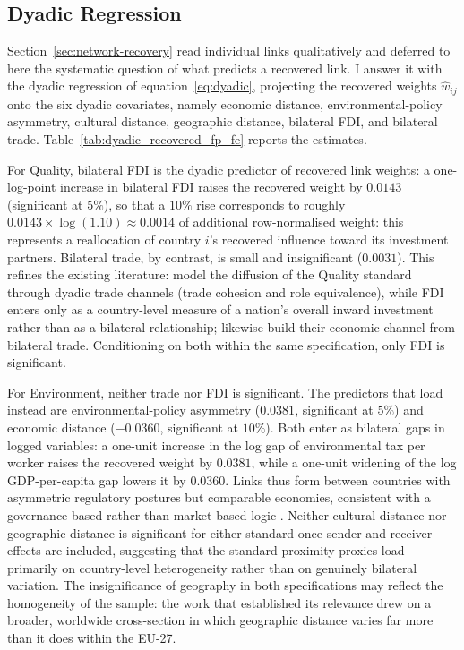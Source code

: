 \documentclass[12pt,a4paper]{article}
\begin{document}
\clearpage

\subsection{Dyadic Regression}
\label{sec:dyadic}

Section~\ref{sec:network-recovery} read individual links qualitatively and deferred to here the systematic question of what predicts a recovered link. I answer it with the dyadic regression of equation~\eqref{eq:dyadic}, projecting the recovered weights $\hat w_{ij}$ onto the six dyadic covariates, namely economic distance, environmental-policy asymmetry, cultural distance, geographic distance, bilateral FDI, and bilateral trade. Table~\ref{tab:dyadic_recovered_fp_fe} reports the estimates.

For Quality, bilateral FDI is the dyadic predictor of recovered link weights: a one-log-point increase in bilateral FDI raises the recovered weight by $0.0143$ (significant at $5\%$), so that a $10\%$ rise corresponds to roughly $0.0143 \times \log(1.10) \approx 0.0014$ of additional row-normalised weight: this represents a reallocation of country $i$'s recovered influence toward its investment partners. Bilateral trade, by contrast, is small and insignificant ($0.0031$). This refines the existing literature: \citet{guler2002} model the diffusion of the Quality standard through dyadic trade channels (trade cohesion and role equivalence), while FDI enters only as a country-level measure of a nation's overall inward investment rather than as a bilateral relationship; \citet{albuquerque2007} likewise build their economic channel from bilateral trade. Conditioning on both within the same specification, only FDI is significant.

For Environment, neither trade nor FDI is significant. The predictors that load instead are environmental-policy asymmetry ($0.0381$, significant at $5\%$) and economic distance ($-0.0360$, significant at $10\%$). Both enter as bilateral gaps in logged variables: a one-unit increase in the log gap of environmental tax per worker raises the recovered weight by $0.0381$, while a one-unit widening of the log GDP-per-capita gap lowers it by $0.0360$. Links thus form between countries with asymmetric regulatory postures but comparable economies, consistent with a governance-based rather than market-based logic \citep{berliner2013}. Neither cultural distance nor geographic distance is significant for either standard once sender and receiver effects are included, suggesting that the standard proximity proxies load primarily on country-level heterogeneity rather than on genuinely bilateral variation. The insignificance of geography in both specifications may reflect the homogeneity of the sample: the work that established its relevance \citep{albuquerque2007} drew on a broader, worldwide cross-section in which geographic distance varies far more than it does within the EU-27.
\end{document}
